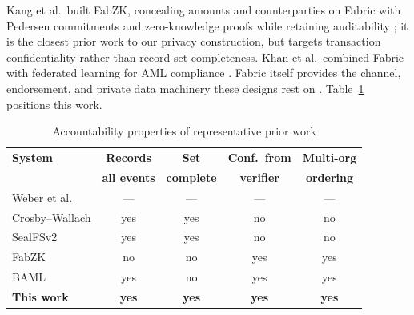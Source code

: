 \documentclass[conference]{IEEEtran}
\begin{document}
Kang et al.\ built FabZK, concealing amounts and counterparties on Fabric with
Pedersen commitments and zero-knowledge proofs while retaining auditability
\cite{kang2019fabzk}; it is the closest prior work to our privacy construction,
but targets transaction confidentiality rather than record-set completeness.
Khan et al.\ combined Fabric with federated learning for AML compliance
\cite{khan2025baml}. Fabric itself provides the channel, endorsement, and
private data machinery these designs rest on \cite{androulaki2018fabric}.
Table~\ref{tab:related} positions this work.

\begin{table}[htbp]
\caption{Accountability properties of representative prior work}
\begin{center}\footnotesize
\renewcommand{\arraystretch}{1.1}
\setlength{\tabcolsep}{3pt}
\begin{tabular}{|l|c|c|c|c|}
\hline
\textbf{System} & \textbf{Records} & \textbf{Set} & \textbf{Conf.\ from} & \textbf{Multi-org}\\
 & \textbf{all events} & \textbf{complete} & \textbf{verifier} & \textbf{ordering}\\
\hline
Weber et al.\ \cite{weber2019aml}          & ---  & ---  & ---  & ---  \\ \hline
Crosby--Wallach \cite{crosby2009tamperevident}  & yes & yes & no & no \\ \hline
SealFSv2 \cite{guardiola2023sealfsv2}       & yes & yes & no & no \\ \hline
FabZK \cite{kang2019fabzk}                  & no  & no  & yes & yes \\ \hline
BAML \cite{khan2025baml}                    & yes & no  & yes & yes \\ \hline
\textbf{This work}                          & \textbf{yes} & \textbf{yes} & \textbf{yes} & \textbf{yes} \\
\hline
\end{tabular}
\end{center}
\label{tab:related}
\end{table}

\end{document}
